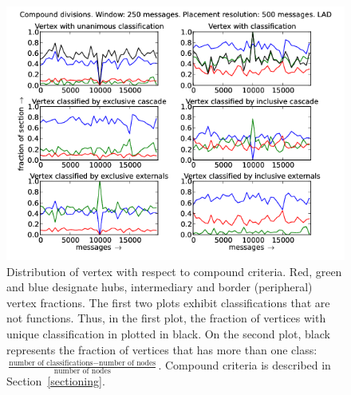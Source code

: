 \documentclass[%
 aip,
 jmp,%
 amsmath,amssymb,
 reprint,%
]{revtex4-1}
\begin{document}
\begin{figure}[hbtp] 
   \centering
        \includegraphics[width=\textwidth]{figs/LAD/250_2}
    \caption{Distribution of vertex with respect to compound criteria. Red, green and blue designate hubs, intermediary and border (peripheral) vertex fractions. The first two plots exhibit classifications that are not functions. Thus, in the first plot, the fraction of vertices with unique classification in plotted in black. On the second plot, black represents the fraction of vertices that has more than one class: $\frac{\text{number of classifications} - \text{number of nodes}}{\text{number of nodes}}$. Compound criteria is described in Section~\ref{sectioning}.}
    \label{fig:lad250_}
\end{figure}
\end{document}
